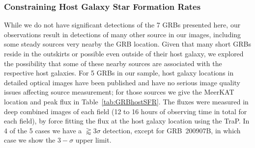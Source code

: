 \documentclass[12pt]{article}
\begin{document}
\subsubsection{Constraining Host Galaxy Star Formation Rates}
While we do not have significant detections of the 7 GRBs presented here, our observations result in detections of many other source in our images, including some steady sources very nearby the GRB location. Given that many short GRBs reside in the outskirts or possible even outside of their host galaxy, we explored the possibility that some of these nearby sources are associated with the respective host galaxies. For 5 GRBs in our sample, host galaxy locations in detailed optical images have been published and have no serious image quality issues affecting source measurement; for those sources we give the MeerKAT location and peak flux in Table~\ref{tab:GRBhostSFR}. The fluxes were measured in deep combined images of each field (12 to 16 hours of observing time in total for each field), by force fitting the flux at the host galaxy location using the TraP. In 4 of the 5 cases we have a $\gtrapprox3\sigma$ detection, except for GRB~200907B, in which case we show the $3-\sigma$ upper limit.
\end{document}
